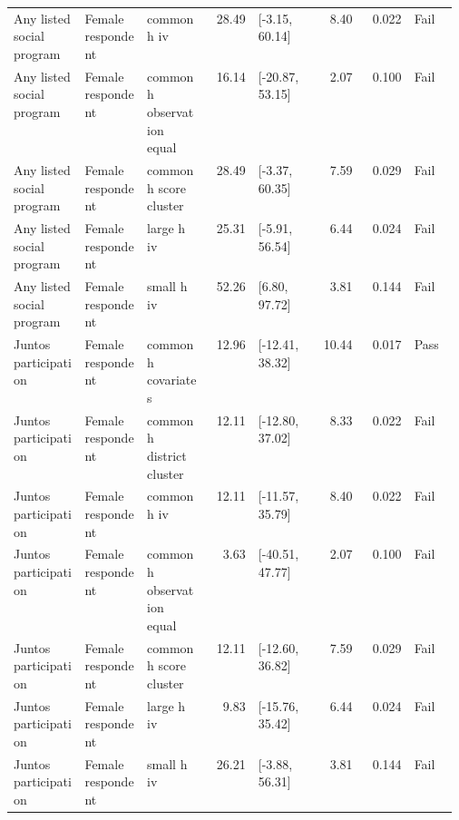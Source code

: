 \begin{longtable}{@{}p{0.16\linewidth}p{0.14\linewidth}p{0.14\linewidth}rp{0.13\linewidth}rrl@{}}
Any listed social program & Female respondent & common h iv & 28.49 & [-3.15, 60.14] & 8.40 & 0.022 & Fail \\
Any listed social program & Female respondent & common h observation equal & 16.14 & [-20.87, 53.15] & 2.07 & 0.100 & Fail \\
Any listed social program & Female respondent & common h score cluster & 28.49 & [-3.37, 60.35] & 7.59 & 0.029 & Fail \\
Any listed social program & Female respondent & large h iv & 25.31 & [-5.91, 56.54] & 6.44 & 0.024 & Fail \\
Any listed social program & Female respondent & small h iv & 52.26 & [6.80, 97.72] & 3.81 & 0.144 & Fail \\
Juntos participation & Female respondent & common h covariates & 12.96 & [-12.41, 38.32] & 10.44 & 0.017 & Pass \\
Juntos participation & Female respondent & common h district cluster & 12.11 & [-12.80, 37.02] & 8.33 & 0.022 & Fail \\
Juntos participation & Female respondent & common h iv & 12.11 & [-11.57, 35.79] & 8.40 & 0.022 & Fail \\
Juntos participation & Female respondent & common h observation equal & 3.63 & [-40.51, 47.77] & 2.07 & 0.100 & Fail \\
Juntos participation & Female respondent & common h score cluster & 12.11 & [-12.60, 36.82] & 7.59 & 0.029 & Fail \\
Juntos participation & Female respondent & large h iv & 9.83 & [-15.76, 35.42] & 6.44 & 0.024 & Fail \\
Juntos participation & Female respondent & small h iv & 26.21 & [-3.88, 56.31] & 3.81 & 0.144 & Fail \\
\end{longtable}
\endgroup

